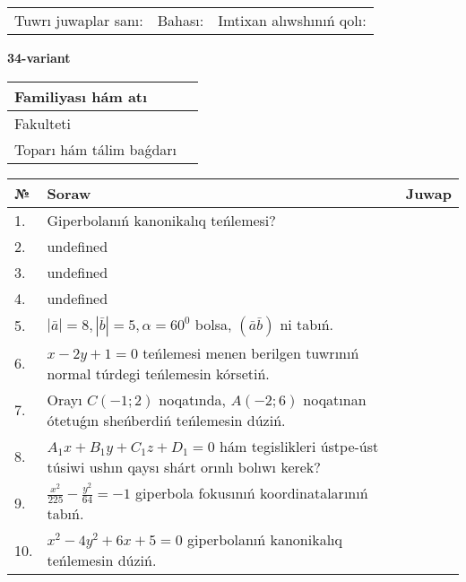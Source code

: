 \documentclass{article}
\begin{document}
\vspace{0.7cm}

\begin{tabular}{lll}
Tuwrı juwaplar sanı: \underline{\hspace{1cm}} & 
Bahası: \underline{\hspace{1cm}} & 
Imtixan alıwshınıń qolı: \underline{\hspace{2cm}} \\
\end{tabular}

\egroup

\newpage


\textbf{34-variant}\\

\bgroup
\def\arraystretch{1.6} %

\begin{tabular}{|m{5.7cm}|m{9.5cm}|}
\hline
Familiyası hám atı & \\
\hline
Fakulteti  & \\
\hline
Toparı hám tálim baǵdarı  & \\
\hline
\end{tabular}

\vspace{0.7cm}

\begin{tabular}{|m{0.7cm}|m{10cm}|m{4cm}|}
\hline
№ & Soraw & Juwap \\
\hline
1. & Giperbolanıń kanonikalıq teńlemesi? &  \\
\hline
2. & undefined &  \\
\hline
3. & undefined &  \\
\hline
4. & undefined &  \\
\hline
5. & \(\left| \bar{a} \right| = 8, \left| \bar{b} \right| = 5, \alpha = 60^{0}\) bolsa, \(( \bar{a}\bar{b} )\) ni tabıń. &  \\
\hline
6. & \(x - 2 y + 1 = 0\) teńlemesi menen berilgen tuwrınıń normal túrdegi teńlemesin kórsetiń. &  \\
\hline
7. & Orayı \(C (- 1;2)\) noqatında, \(A (- 2;6 )\) noqatınan ótetuǵın sheńberdiń teńlemesin dúziń. &  \\
\hline
8. & \(A_{1}x + B_{1}y + C_{1}z + D_{1} = 0\) hám tegislikleri ústpe-úst túsiwi ushın qaysı shárt orınlı bolıwı kerek? &  \\
\hline
9. & \(\frac{x^{2}}{225} - \frac{y^{2}}{64} = - 1\) giperbola fokusınıń koordinatalarınıń tabıń. &  \\
\hline
10. & \(x^{2} - 4 y^{2} + 6 x + 5 = 0\) giperbolanıń kanonikalıq teńlemesin dúziń. & \\
\hline
\end{tabular}
\end{document}
